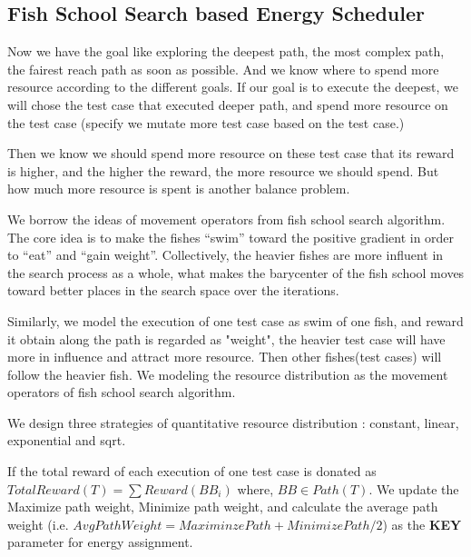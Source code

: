 \subsection{Fish School Search based Energy Scheduler}

Now we have the goal like exploring the deepest path, the most complex path, the fairest reach path as soon as possible. And we know where to spend more resource according to the different goals. If our goal is to execute the deepest, we will chose the test case that executed deeper path, and spend more resource on the test case (specify we mutate more test case based on the test case.)

Then we know we should spend more resource on these test case that its reward is higher, and the higher the reward, the more resource we should spend. But how much more resource is spent is another balance problem.

We borrow the ideas of movement operators from fish school search algorithm. The core idea is to make the fishes “swim” toward the positive gradient in order to “eat” and “gain weight”. Collectively, the heavier fishes are more influent in the search process as a whole, what makes the barycenter of the fish school moves toward better places in the search space over the iterations.

Similarly, we model the execution of one test case as swim of one fish,  and reward it obtain along the path is regarded as "weight", the heavier test case will have more in influence and attract more resource. Then other fishes(test cases) will follow the heavier fish. We modeling the resource distribution as the movement operators of fish school search algorithm.


We design three strategies of quantitative resource distribution : constant, linear, exponential and sqrt.

If the total reward of each execution of one test case is donated as $TotalReward(T) = \sum Reward(BB_{i})$ where, $BB \in Path(T)$. We update the Maximize path weight,  Minimize path weight, and calculate the average path weight (i.e. $AvgPathWeight= MaximinzePath + MinimizePath /2$) as the \textbf{KEY } parameter for energy assignment.



